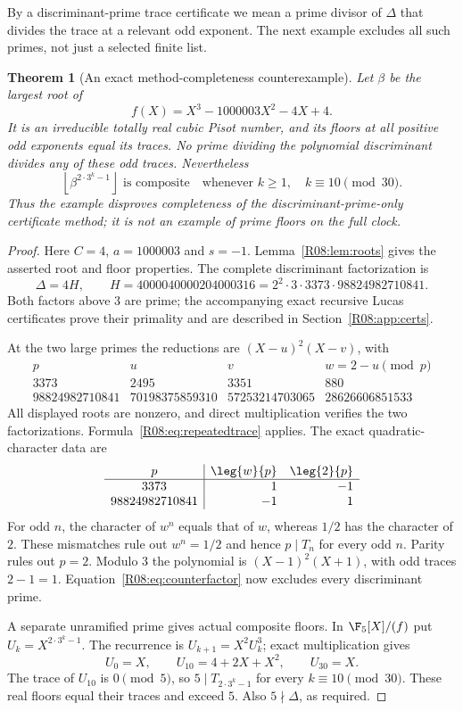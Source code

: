 \documentclass[11pt,a4paper]{article}
\newtheorem{theorem}{Theorem}[section]
\theoremstyle{definition}\newtheorem{definition}[theorem]{Definition}
\theoremstyle{remark}\newtheorem{remark}[theorem]{Remark}
\newcommand{\floor}[1]{\left\lfloor#1\right\rfloor}
\begin{document}
By a discriminant-prime trace certificate we mean a prime divisor of
$\Delta$ that divides the trace at a relevant odd exponent.
The next example excludes all such primes, not just a selected finite list.

\begin{theorem}[An exact method-completeness counterexample]\label{R08:thm:counter}
Let $\beta$ be the largest root of
\[
                      f(X)=X^3-1000003X^2-4X+4.
\]
It is an irreducible totally real cubic Pisot number, and its floors at
all positive odd exponents equal its traces.
No prime dividing the polynomial discriminant divides any of these
odd traces. Nevertheless
\[
                 \floor{\beta^{2\cdot3^k-1}}\text{ is composite}
                          \quad\text{whenever }k\ge1,\quad k\equiv10\pmod{30}.
\]
Thus the example disproves completeness of the discriminant-prime-only
certificate method; it is not an example of prime floors on the full clock.
\end{theorem}
\begin{proof}
Here $C=4$, $a=1000003$ and $s=-1$.
Lemma~\ref{R08:lem:roots} gives the asserted root and floor properties.
The complete discriminant factorization is
\begin{equation}\label{R08:eq:counterfactor}
 \Delta=4H,\qquad
 H=4000040000204000316=2^2\cdot3\cdot3373\cdot98824982710841.
\end{equation}
Both factors above $3$ are prime; the accompanying exact recursive
Lucas certificates prove their primality and are described in
Section~\ref{R08:app:certs}.

At the two large primes the reductions are $(X-u)^2(X-v)$, with
\[
\begin{array}{c|rrr}
p&u&v&w=2-u\pmod p\\\hline
3373&2495&3351&880\\
98824982710841&70198375859310&57253214703065&28626606851533
\end{array}
\]
All displayed roots are nonzero, and direct multiplication verifies
the two factorizations. Formula~\eqref{R08:eq:repeatedtrace} applies.
The exact quadratic-character data are
\[
\begin{array}{c|rr}
p&\leg{w}{p}&\leg{2}{p}\\\hline
3373&1&-1\\
98824982710841&-1&1
\end{array}
\]
For odd $n$, the character of $w^n$ equals that of $w$, whereas
$1/2$ has the character of $2$. These mismatches rule out
$w^n=1/2$ and hence $p\mid T_n$ for every odd $n$.
Parity rules out $p=2$. Modulo $3$ the polynomial is
$(X-1)^2(X+1)$, with odd traces $2-1=1$.
Equation~\eqref{R08:eq:counterfactor} now excludes every discriminant prime.

A separate unramified prime gives actual composite floors.
In $\F_5[X]/(f)$ put $U_k=X^{2\cdot3^k-1}$.
The recurrence is $U_{k+1}=X^2U_k^3$; exact multiplication gives
\[
                U_0=X,\qquad U_{10}=4+2X+X^2,\qquad U_{30}=X.
\]
The trace of $U_{10}$ is $0\pmod5$, so $5\mid T_{2\cdot3^k-1}$
for every $k\equiv10\pmod{30}$. These real floors equal their traces
and exceed $5$. Also $5\nmid\Delta$, as required.
\end{proof}
\end{document}
